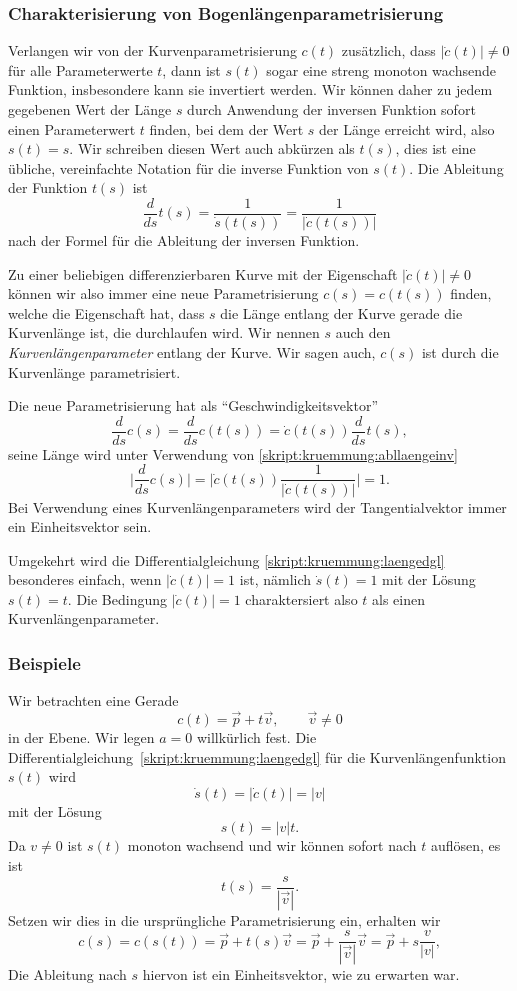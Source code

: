 \subsubsection{Charakterisierung von Bogenlängenparametrisierung}
Verlangen wir von der Kurvenparametrisierung $c(t)$ zusätzlich,
dass $|\dot c(t)|\ne 0$ für alle Parameterwerte $t$, dann ist
$s(t)$ sogar eine streng monoton wachsende Funktion, insbesondere
kann sie invertiert werden.
Wir können daher zu jedem gegebenen Wert der Länge $s$ durch
Anwendung der inversen Funktion sofort einen Parameterwert $t$
finden, bei dem der Wert $s$ der Länge erreicht wird, also
$s(t)=s$.
Wir schreiben diesen Wert auch abkürzen als $t(s)$, dies ist eine
übliche, vereinfachte Notation für die inverse Funktion von $s(t)$.
Die Ableitung der Funktion $t(s)$ ist
\begin{equation}
\frac{d}{ds} t(s) = \frac{1}{\dot s(t(s))} = \frac1{|\dot c(t(s))|}
\label{skript:kruemmung:abllaengeinv}
\end{equation}
nach der Formel für die Ableitung der inversen Funktion.

Zu einer beliebigen differenzierbaren Kurve mit der Eigenschaft
$|\dot c(t)|\ne 0$ können wir also immer eine neue Parametrisierung
$c(s)=c(t(s))$ finden, welche die Eigenschaft hat, dass $s$ die
Länge entlang der Kurve gerade die Kurvenlänge ist, die durchlaufen
wird.
Wir nennen $s$ auch den {\em Kurvenlängenparameter} entlang der
Kurve.
%
Wir sagen auch, $c(s)$ ist durch die Kurvenlänge parametrisiert.

Die neue Parametrisierung hat als ``Geschwindigkeitsvektor''
\[
\frac{d}{ds} c(s)
=
\frac{d}{ds} c(t(s))
=
\dot c(t(s)) \frac{d}{ds}t(s),
\]
seine Länge wird unter Verwendung von
\eqref{skript:kruemmung:abllaengeinv}
\[
\biggl|
\frac{d}{ds} c(s)
\biggr|
=
\biggl|\dot c(t(s))\frac1{|\dot c(t(s))|}\biggr|
=
1.
\]
Bei Verwendung eines Kurvenlängenparameters wird der Tangentialvektor
immer ein Einheitsvektor sein.

Umgekehrt wird die Differentialgleichung \eqref{skript:kruemmung:laengedgl}
besonderes einfach, wenn $|\dot c(t)|=1$ ist, nämlich $\dot s(t)=1$ mit
der Lösung $s(t)=t$.
Die Bedingung $|\dot c(t)|=1$ charaktersiert also $t$ als einen
Kurvenlängenparameter.

\subsubsection{Beispiele}
\begin{beispiel}
Wir betrachten eine Gerade 
\[
c(t)=\vec p + t\vec v,\qquad \vec v\ne 0
\]
in der Ebene.
Wir legen $a=0$ willkürlich fest.
Die Differentialgleichung~\eqref{skript:kruemmung:laengedgl} für die
Kurven\-längen\-funktion $s(t)$ wird
\[
\dot s(t) = |\dot c(t)| = |v|
\]
mit der Lösung
\[
s(t)=|v|t.
\]
Da $v\ne 0$ ist $s(t)$ monoton wachsend und wir können sofort nach
$t$ auflösen, es ist
\[
t(s)=\frac{s}{|\vec v|}.
\]
Setzen wir dies in die ursprüngliche Parametrisierung ein, erhalten
wir
\[
c(s)
=
c(s(t))
=
\vec p + t(s)\vec v
=
\vec p + \frac{s}{|\vec v|}\vec v
=
\vec p + s\frac{v}{|v|},
\]
Die Ableitung nach $s$ hiervon ist ein Einheitsvektor, wie zu erwarten
war.
\end{beispiel}

